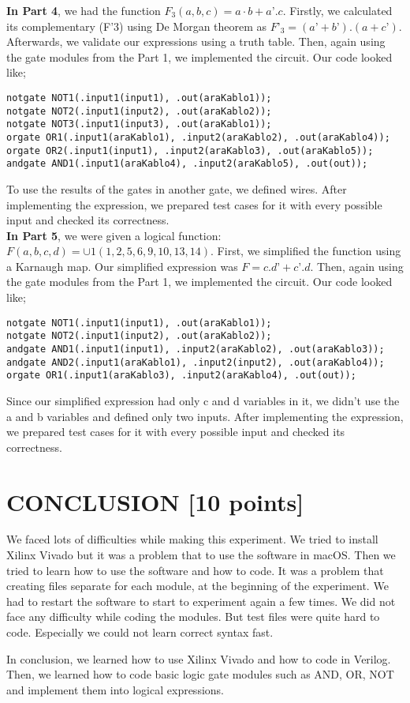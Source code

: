 \documentclass[pdftex,12pt,a4paper]{article}
\begin{document}
\textbf{In Part 4}, we had the function \(F_3(a, b, c) = a · b + a’ . c \). Firstly, we calculated its complementary (F’3) using De Morgan theorem as \(F’_3 = (a’ + b’) . (a + c’)\). Afterwards, we validate our expressions using a truth table. Then, again using the gate modules from the Part 1, we implemented the circuit. Our code looked like;\\

\begin{verbatim}
notgate NOT1(.input1(input1), .out(araKablo1)); 
notgate NOT2(.input1(input2), .out(araKablo2)); 
notgate NOT3(.input1(input3), .out(araKablo1)); 
orgate OR1(.input1(araKablo1), .input2(araKablo2), .out(araKablo4)); 
orgate OR2(.input1(input1), .input2(araKablo3), .out(araKablo5));
andgate AND1(.input1(araKablo4), .input2(araKablo5), .out(out)); 
\end{verbatim}

To use the results of the gates in another gate, we defined wires. After implementing the expression, we prepared test cases for it with every possible input and checked its correctness.\\

\textbf{In Part 5}, we were given a logical function: \(F(a, b, c, d) = ∪1(1, 2, 5, 6, 9, 10, 13, 14)\). First, we simplified the function using a Karnaugh map. Our simplified expression was \(F = c . d’ + c’ . d\). Then, again using the gate modules from the Part 1, we implemented the circuit. Our code looked like; 

\begin{verbatim}
notgate NOT1(.input1(input1), .out(araKablo1)); 
notgate NOT2(.input1(input2), .out(araKablo2)); 
andgate AND1(.input1(input1), .input2(araKablo2), .out(araKablo3)); 
andgate AND2(.input1(araKablo1), .input2(input2), .out(araKablo4)); 
orgate OR1(.input1(araKablo3), .input2(araKablo4), .out(out));  
\end{verbatim}

Since our simplified expression had only c and d variables in it, we didn’t use the a and b variables and defined only two inputs. After implementing the expression, we prepared test cases for it with every possible input and checked its correctness.


\section{CONCLUSION [10 points]}
We faced lots of difficulties while making this experiment. We tried to install Xilinx Vivado but it was a problem that to use the software in macOS. Then we tried to learn how to use the software and how to code.
It was a problem that creating files separate for each module, at the beginning of the experiment.  We had to restart the software to start to experiment again a few times. We did not face any difficulty while coding the modules. But test files were quite hard to code. Especially we could not learn correct syntax fast.

In conclusion, we learned how to use Xilinx Vivado and how to code in Verilog. Then, we learned how to code basic logic gate modules such as AND, OR, NOT and implement them into logical expressions. 
\end{document}
